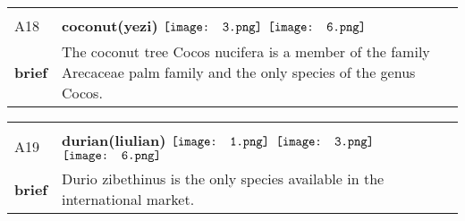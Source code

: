 \documentclass[UTF8]{article}
\begin{document}
            \begin{tabularx}{\textwidth}{p{1.5cm}X}
            \arrayrulecolor{myBlue}
        	\hline\\
            \small{A18}&
            \large{\bfseries{coconut(yezi)}}\hfill
                                                            \phantom{$\vcenter{\hbox{\texttt{[image: 1.png]}}}$}
                                                                \phantom{$\vcenter{\hbox{\texttt{[image: 2.png]}}}$}
                                                                $\vcenter{\hbox{\texttt{[image: 3.png]}}}$
                                                                \phantom{$\vcenter{\hbox{\texttt{[image: 4.png]}}}$}
                                                                \phantom{$\vcenter{\hbox{\texttt{[image: 5.png]}}}$}
                                                                $\vcenter{\hbox{\texttt{[image: 6.png]}}}$
                                                                \phantom{$\vcenter{\hbox{\texttt{[image: 7.png]}}}$}
                                        \\[10pt]
            \large{\bfseries{brief}}&\noindent\parbox[c]{\hsize}{The coconut tree Cocos nucifera is a member of the family Arecaceae palm family and the only species of the genus Cocos.} \\[5pt]
            \hline\\[-10pt]
        \end{tabularx}
            \begin{tabularx}{\textwidth}{p{1.5cm}X}
            \arrayrulecolor{myBlue}
        	\hline\\
            \small{A19}&
            \large{\bfseries{durian(liulian)}}\hfill
                                                            $\vcenter{\hbox{\texttt{[image: 1.png]}}}$
                                                                \phantom{$\vcenter{\hbox{\texttt{[image: 2.png]}}}$}
                                                                $\vcenter{\hbox{\texttt{[image: 3.png]}}}$
                                                                \phantom{$\vcenter{\hbox{\texttt{[image: 4.png]}}}$}
                                                                \phantom{$\vcenter{\hbox{\texttt{[image: 5.png]}}}$}
                                                                $\vcenter{\hbox{\texttt{[image: 6.png]}}}$
                                                                \phantom{$\vcenter{\hbox{\texttt{[image: 7.png]}}}$}
                                        \\[10pt]
            \large{\bfseries{brief}}&\noindent\parbox[c]{\hsize}{Durio zibethinus is the only species available in the international market.} \\[5pt]
            \hline\\[-10pt]
        \end{tabularx}
\end{document}

